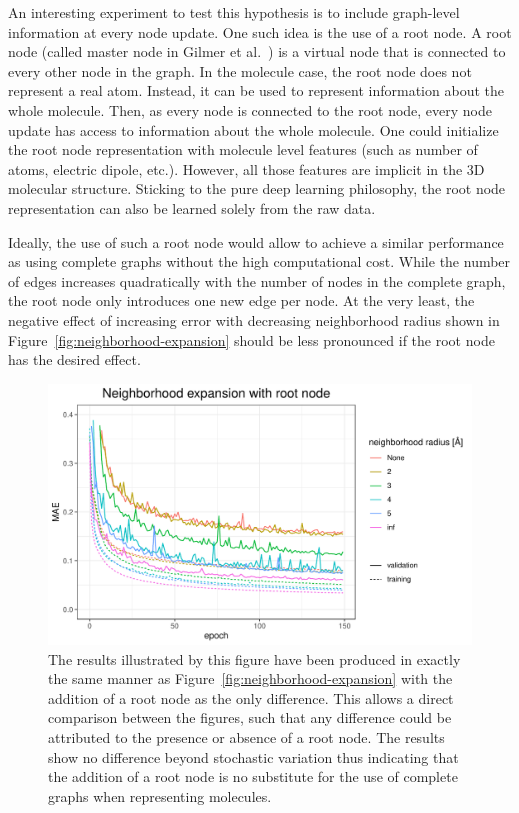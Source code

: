 An interesting experiment to test this hypothesis is to include graph-level information at every node update. One such idea is the use of a root node. A root node (called master node in Gilmer et al.~\cite{Gilmer2017}) is a virtual node that is connected to every other node in the graph. In the molecule case, the root node does not represent a real atom. Instead, it can be used to represent information about the whole molecule. Then, as every node is connected to the root node, every node update has access to information about the whole molecule. One could initialize the root node representation with molecule level features (such as number of atoms, electric dipole, etc.). However, all those features are implicit in the 3D molecular structure. Sticking to the pure deep learning philosophy, the root node representation can also be learned solely from the raw data.

Ideally, the use of such a root node would allow to achieve a similar performance as using complete graphs without the high computational cost. While the number of edges increases quadratically with the number of nodes in the complete graph, the root node only introduces one new edge per node. At the very least, the negative effect of increasing error with decreasing neighborhood radius shown in Figure~\ref{fig:neighborhood-expansion} should be less pronounced if the root node has the desired effect.

\begin{figure}[H]
	\includegraphics[width=\linewidth]{figures/neighborhood-expansion-root-weight}
	\caption{The results illustrated by this figure have been produced in exactly the same manner as Figure~\ref{fig:neighborhood-expansion} with the addition of a root node as the only difference. This allows a direct comparison between the figures, such that any difference could be attributed to the presence or absence of a root node. The results show no difference beyond stochastic variation thus indicating that the addition of a root node is no substitute for the use of complete graphs when representing molecules.}
	\label{fig:neighborhood-expansion-root-weight}
\end{figure}

